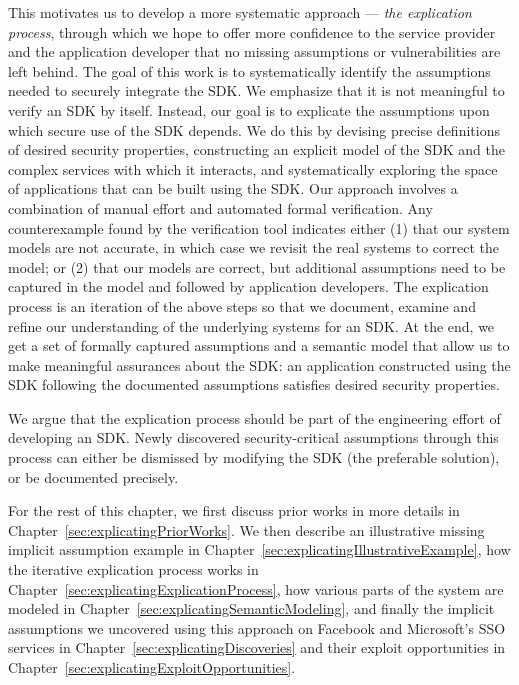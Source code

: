 This motivates us to develop a more systematic approach --- \emph{the explication process}, through which we hope to offer more confidence to the service provider and the application developer that no missing assumptions or vulnerabilities are left behind.  The goal of this work is to systematically identify the assumptions needed to securely integrate the SDK.  We emphasize that it is not meaningful to verify an SDK by itself.  Instead, our goal is to explicate the assumptions upon which secure use of the SDK depends.  We do this by devising precise definitions of desired security properties, constructing an explicit model of the SDK and the complex services with which it interacts, and systematically exploring the space of applications that can be built using the SDK.  Our approach involves a combination of manual effort and automated formal verification.  Any counterexample found by the verification tool indicates either (1) that our system models are not accurate, in which case we revisit the real systems to correct the model; or (2) that our models are correct, but additional assumptions need to be captured in the model and followed by application developers.  The explication process is an iteration of the above steps so that we document, examine and refine our understanding of the underlying systems for an SDK.  At the end, we get a set of formally captured assumptions and a semantic model that allow us to make meaningful assurances about the SDK: an application constructed using the SDK following the documented assumptions satisfies desired security properties.

We argue that the explication process should be part of the engineering effort of developing an SDK.  Newly discovered security-critical assumptions through this process can either be dismissed by modifying the SDK (the preferable solution), or be documented precisely.

For the rest of this chapter, we first discuss prior works in more details in Chapter~\ref{sec:explicatingPriorWorks}.  We then describe an illustrative missing implicit assumption example in Chapter~\ref{sec:explicatingIllustrativeExample}, how the iterative explication process works in Chapter~\ref{sec:explicatingExplicationProcess}, how various parts of the system are modeled in Chapter~\ref{sec:explicatingSemanticModeling}, and finally the implicit assumptions we uncovered using this approach on Facebook and Microsoft's SSO services in Chapter~\ref{sec:explicatingDiscoveries} and their exploit opportunities in Chapter~\ref{sec:explicatingExploitOpportunities}.

